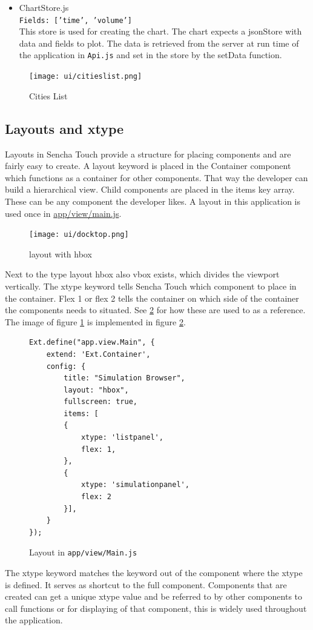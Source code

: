 \begin{itemize}
\item ChartStore.js \\
\texttt{Fields: ['time', 'volume']}\\
This store is used for creating the chart. The chart expects a jsonStore with data and fields to plot. The data is retrieved from the server at run time of the application in \texttt{Api.js} and set in the store by the setData function.
\end{itemize}

\begin{figure}[H]
\texttt{[image: ui/citieslist.png]}
\caption{Cities List}
\end{figure}


\subsection{Layouts and xtype}
Layouts in Sencha Touch provide a structure for placing components and are fairly easy to create. A layout keyword is placed in the Container component which functions as a container for other components. That way the developer can build a hierarchical view. Child components are placed in the items key array. These can be any component the developer likes. A layout in this application is used once in \url{app/view/main.js}. 

\begin{figure}[H]
\center
\texttt{[image: ui/docktop.png]}
\caption{layout with hbox}
\label{fig:layout}
\end{figure}

Next to the type layout hbox also vbox exists, which divides the viewport vertically.  The xtype keyword tells Sencha Touch which component to place in the container. Flex 1 or flex 2 tells the container on which side of the container the components needs to situated. See \ref{fig:layout_impl} for how these are used to as a reference. The image of figure \ref{fig:layout} is implemented in figure \ref{fig:layout_impl}.

\begin{figure}[H]
\begin{lstlisting}
Ext.define("app.view.Main", {
    extend: 'Ext.Container',
    config: {
        title: "Simulation Browser",
        layout: "hbox",
        fullscreen: true,
        items: [
        {
            xtype: 'listpanel',
            flex: 1,
        },
        {    
            xtype: 'simulationpanel',
            flex: 2
        }],
    }
});
\end{lstlisting}
\caption{Layout in \texttt{app/view/Main.js}}
\label{fig:layout_impl}
\end{figure}
The xtype keyword matches the keyword out of the component where the xtype is defined. It serves as shortcut to the full component. Components that are created can get a unique xtype value and be referred to by other components to call functions or for displaying  of that component, this is widely used throughout the application.
 

